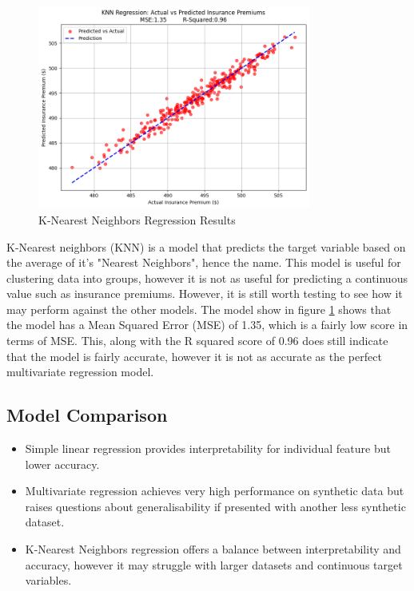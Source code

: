 \documentclass{article}
\begin{document}
\begin{figure}[h]
\centering
\includegraphics[width=0.8\textwidth]{knn_regression.png}
\caption{K-Nearest Neighbors Regression Results}\label{fig:knn_regression}
\end{figure}

K-Nearest neighbors (KNN) is a model that predicts the target variable based on the average of it's "Nearest Neighbors", hence the name. This model is useful for clustering data into groups, however it is not as useful for predicting a continuous value such as insurance premiums. However, it is still worth testing to see how it may perform against the other models. The model show in figure \ref{fig:knn_regression} shows that the model has a Mean Squared Error (MSE) of 1.35, which is a fairly low score in terms of MSE. This, along with the R squared score of 0.96 does still indicate that the model is fairly accurate, however it is not as accurate as the perfect multivariate regression model.

\subsection{Model Comparison}

\begin{itemize}
\item Simple linear regression provides interpretability for individual feature but lower accuracy.
\item Multivariate regression achieves very high performance on synthetic data but raises questions about generalisability if presented with another less synthetic dataset.
\item K-Nearest Neighbors regression offers a balance between interpretability and accuracy, however it may struggle with larger datasets and continuous target variables.
\end{itemize}
\end{document}
